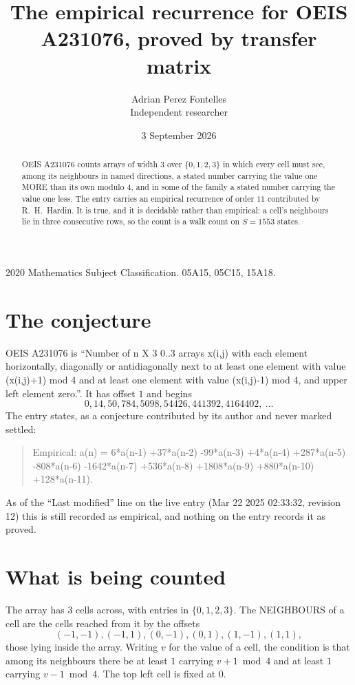 \documentclass[11pt,a4paper]{article}
\title{The empirical recurrence for OEIS A231076, proved by transfer matrix}
\author{Adrian Perez Fontelles\\ \small Independent researcher}
\date{3 September 2026}
\theoremstyle{plain}
\theoremstyle{definition}
\begin{document}
\maketitle

\begin{abstract}
OEIS A231076 counts arrays of width $3$ over $\{0,1,2,3\}$ in which every cell must see, among its
neighbours in named directions, a stated number carrying the value one MORE than its own
modulo $4$, and in some of the family a stated number carrying the value one less. The entry
carries an empirical recurrence of order $11$ contributed by R.~H.~Hardin. It is true, and
it is decidable rather than empirical: a cell's neighbours lie in three consecutive rows, so
the count is a walk count on $S=1553$ states.
\end{abstract}

\noindent\small 2020 Mathematics Subject Classification. 05A15, 05C15, 15A18.\normalsize

\section{The conjecture}

OEIS A231076 is ``Number of n X 3 0..3 arrays x(i,j) with each element horizontally, diagonally or antidiagonally next to at least one element with value (x(i,j)+1) mod 4 and at least one element with value (x(i,j)-1) mod 4, and upper left element zero.''. It has offset $1$ and begins
\[
0, 14, 50, 784, 5098, 54426, 441392, 4164402,\ \dots
\]
The entry states, as a conjecture contributed by its author and never marked settled:
\begin{quote}
Empirical: a(n) = 6*a(n-1) +37*a(n-2) -99*a(n-3) +4*a(n-4) +287*a(n-5) -808*a(n-6) -1642*a(n-7) +536*a(n-8) +1808*a(n-9) +880*a(n-10) +128*a(n-11).
\end{quote}
As of the ``Last modified'' line on the live entry (Mar 22 2025 02:33:32, revision 12) this is still
recorded as empirical, and nothing on the entry records it as proved.

\section{What is being counted}

The array has $3$ cells across, with entries in $\{0,1,2,3\}$. The NEIGHBOURS of a cell are the
cells reached from it by the offsets
\[
(-1,-1), (-1,1), (0,-1), (0,1), (1,-1), (1,1),
\]
those lying inside the array. Writing $v$ for the value of a cell, the condition is that among
its neighbours there be at least $1$ carrying $v+1 \bmod 4$ and at least $1$ carrying $v-1 \bmod 4$. The top left
cell is fixed at $0$.
\end{document}
